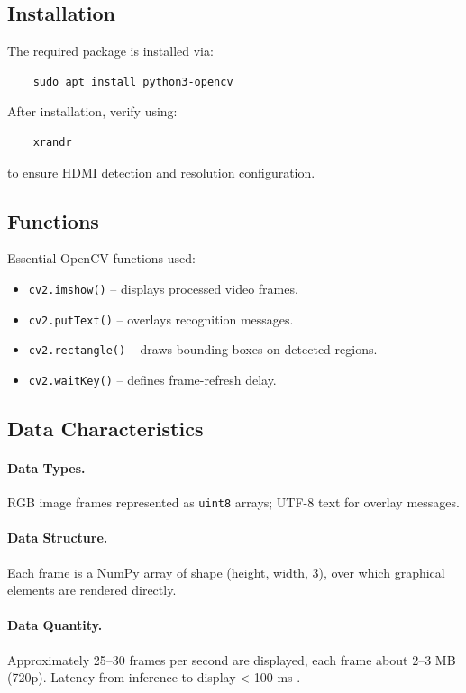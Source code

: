 \subsection{Installation}
The required package is installed via:
\begin{verbatim}
	sudo apt install python3-opencv
\end{verbatim}
After installation, verify using:
\begin{verbatim}
	xrandr
\end{verbatim}
to ensure HDMI detection and resolution configuration.

\subsection{Functions}
Essential OpenCV functions used:
\begin{itemize}
	\item \texttt{cv2.imshow()} – displays processed video frames.
	\item \texttt{cv2.putText()} – overlays recognition messages.
	\item \texttt{cv2.rectangle()} – draws bounding boxes on detected regions.
	\item \texttt{cv2.waitKey()} – defines frame-refresh delay.
\end{itemize}

\subsection{Data Characteristics}
\paragraph{Data Types.}  
RGB image frames represented as \texttt{uint8} arrays; UTF-8 text for overlay messages.

\paragraph{Data Structure.}  
Each frame is a NumPy array of shape (height, width, 3), over which graphical elements are rendered directly.

\paragraph{Data Quantity.}  
Approximately 25–30 frames per second are displayed, each frame about 2–3 MB (720p).  
Latency from inference to display < 100 ms \cite{edgeAIbook}.

